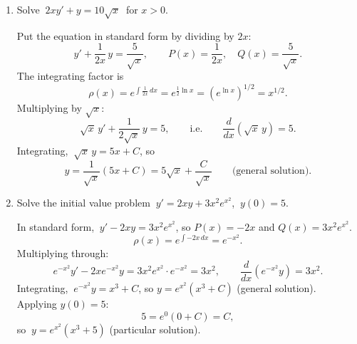 \documentclass[10pt]{article}
\begin{document}
\begin{enumerate}[leftmargin=*, label=\numbox{\arabic*}]

\item
    \begin{problem}[\vspace{6cm}]
        Solve \(\ 2xy' + y = 10\sqrt{x}\ \) for \(x > 0\).
    \end{problem}
    \begin{solution}
        Put the equation in standard form by dividing by \(2x\):
        \[
            y' + \frac{1}{2x}\,y = \frac{5}{\sqrt{x}},
            \qquad P(x) = \frac{1}{2x}, \quad Q(x) = \frac{5}{\sqrt{x}}.
        \]
        The integrating factor is
        \[
            \rho(x) = e^{\int \frac{1}{2x}\,dx} = e^{\frac{1}{2}\ln x} = (e^{\ln x})^{1/2} = x^{1/2}.
        \]
        Multiplying by \(\sqrt{x}\):
        \[
            \sqrt{x}\,y' + \frac{1}{2\sqrt{x}}\,y = 5,
            \qquad\text{i.e.}\qquad \frac{d}{dx}\!\left(\sqrt{x}\,y\right) = 5.
        \]
        Integrating, \(\ \sqrt{x}\,y = 5x + C\), so
        \[
            y = \frac{1}{\sqrt{x}}(5x + C) = 5\sqrt{x} + \frac{C}{\sqrt{x}} \qquad\text{(general solution).}
        \]
    \end{solution}

\item
    \begin{problem}[\vspace{6cm}]
        Solve the initial value problem \(\ y' = 2xy + 3x^2 e^{x^2}\), \(\ y(0) = 5\).
    \end{problem}
    \begin{solution}
        In standard form, \(\ y' - 2xy = 3x^2 e^{x^2}\), so \(P(x) = -2x\) and \(Q(x) = 3x^2 e^{x^2}\).
        \[
            \rho(x) = e^{\int -2x\,dx} = e^{-x^2}.
        \]
        Multiplying through:
        \[
            e^{-x^2}y' - 2x e^{-x^2}y = 3x^2 e^{x^2}\cdot e^{-x^2} = 3x^2,
            \qquad \frac{d}{dx}\!\left(e^{-x^2}y\right) = 3x^2.
        \]
        Integrating, \(\ e^{-x^2}y = x^3 + C\), so \(y = e^{x^2}(x^3 + C)\) (general solution).
        Applying \(y(0) = 5\):
        \[
            5 = e^{0}(0 + C) = C,
        \]
        so \(\ y = e^{x^2}(x^3 + 5)\) (particular solution).
    \end{solution}


\end{enumerate}
\end{document}
